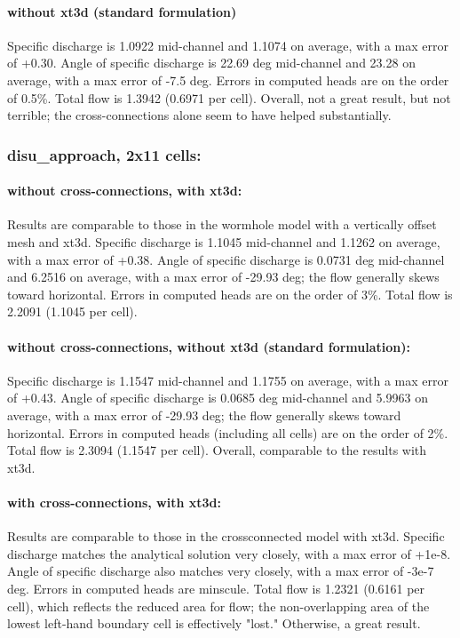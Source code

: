 \documentclass{article}
\begin{document}
\paragraph{without xt3d (standard formulation)}  Specific discharge is 1.0922 mid-channel and 1.1074 on average, with a max error of +0.30. Angle of specific discharge is 22.69 deg mid-channel and 23.28 on average, with a max error of -7.5 deg. Errors in computed heads are on the order of 0.5\%. Total flow is 1.3942 (0.6971 per cell). Overall, not a great result, but not terrible; the cross-connections alone seem to have helped substantially.

\subsubsection{disu\_approach, 2x11 cells:}

\paragraph{without cross-connections, with xt3d:} Results are comparable to those in the wormhole model with a vertically offset mesh and xt3d. Specific discharge is 1.1045 mid-channel and 1.1262 on average, with a max error of +0.38. Angle of specific discharge is 0.0731 deg mid-channel and 6.2516 on average, with a max error of -29.93 deg; the flow generally skews toward horizontal. Errors in computed heads are on the order of 3\%. Total flow is 2.2091 (1.1045 per cell).

\paragraph{without cross-connections, without xt3d (standard formulation):} Specific discharge is 1.1547 mid-channel and 1.1755 on average, with a max error of +0.43. Angle of specific discharge is 0.0685 deg mid-channel and 5.9963 on average, with a max error of -29.93 deg; the flow generally skews toward horizontal. Errors in computed heads (including all cells) are on the order of 2\%. Total flow is 2.3094 (1.1547 per cell). Overall, comparable to the results with xt3d.

\paragraph{with cross-connections, with xt3d:} Results are comparable to those in the crossconnected model with xt3d. Specific discharge matches the analytical solution very closely, with a max error of +1e-8. Angle of specific discharge also matches very closely, with a max error of -3e-7 deg. Errors in computed heads are minscule. Total flow is 1.2321 (0.6161 per cell), which reflects the reduced area for flow; the non-overlapping area of the lowest left-hand boundary cell is effectively "lost." Otherwise, a great result.
\end{document}
